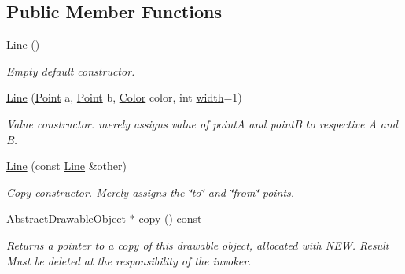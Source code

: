 \subsection*{Public Member Functions}
\begin{DoxyCompactItemize}
\item 
\mbox{\label{classcturtle_1_1Line_ac6d8c8133ddbb5cafa31be364b0ed4f6}} 
\hyperlink{classcturtle_1_1Line_ac6d8c8133ddbb5cafa31be364b0ed4f6}{Line} ()
\begin{DoxyCompactList}\small\item\em Empty default constructor. \end{DoxyCompactList}\item 
\hyperlink{classcturtle_1_1Line_ae08d302308c4b10cc714508b2acca228}{Line} (\hyperlink{structcturtle_1_1ivec2}{Point} a, \hyperlink{structcturtle_1_1ivec2}{Point} b, \hyperlink{classcturtle_1_1Color}{Color} color, int \hyperlink{classcturtle_1_1Line_ae0c426af211fc443b7ad2bed4c30050b}{width}=1)
\begin{DoxyCompactList}\small\item\em Value constructor. merely assigns value of pointA and pointB to respective A and B. \end{DoxyCompactList}\item 
\hyperlink{classcturtle_1_1Line_ac1b144ecd3e23c5f296b4f845f332c73}{Line} (const \hyperlink{classcturtle_1_1Line}{Line} \&other)
\begin{DoxyCompactList}\small\item\em Copy constructor. Merely assigns the \char`\"{}to\char`\"{} and \char`\"{}from\char`\"{} points. \end{DoxyCompactList}\item 
\mbox{\label{classcturtle_1_1Line_a004870caac1e5632064ff28ae5a7e0ff}} 
\hyperlink{classcturtle_1_1AbstractDrawableObject}{Abstract\+Drawable\+Object} $\ast$ \hyperlink{classcturtle_1_1Line_a004870caac1e5632064ff28ae5a7e0ff}{copy} () const
\begin{DoxyCompactList}\small\item\em Returns a pointer to a copy of this drawable object, allocated with N\+EW. Result Must be deleted at the responsibility of the invoker. \end{DoxyCompactList}\item 
\mbox{\label{classcturtle_1_1Line_a885276e725f86d89f79b32ee3d885079}} 

\end{DoxyCompactItemize}

